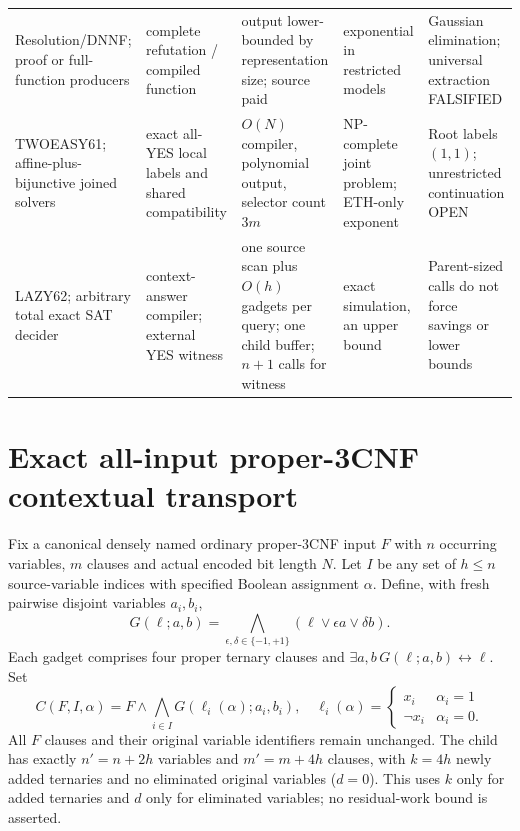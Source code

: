 \documentclass[11pt]{article}
\begin{document}
\begin{tabularx}{\linewidth}{@{}p{0.83in}p{1.02in}p{1.42in}p{1.14in}X@{}}
Resolution/DNNF; proof or full-function producers & complete refutation / compiled function & output lower-bounded by representation size; source paid & exponential in restricted models & Gaussian elimination; universal extraction FALSIFIED\\
TWOEASY61; affine-plus-bijunctive joined solvers & exact all-YES local labels and shared compatibility & $O(N)$ compiler, polynomial output, selector count $3m$ & NP-complete joint problem; ETH-only exponent & Root labels $(1,1)$; unrestricted continuation OPEN\\
LAZY62; arbitrary total exact SAT decider & context-answer compiler; external YES witness & one source scan plus $O(h)$ gadgets per query; one child buffer; $n+1$ calls for witness & exact simulation, an upper bound & Parent-sized calls do not force savings or lower bounds\\
\bottomrule
\end{tabularx}
\endgroup

\section{Exact all-input proper-3CNF contextual transport}
Fix a canonical densely named ordinary proper-3CNF input $F$ with $n$ occurring variables, $m$ clauses and actual encoded bit length $N$. Let $I$ be any set of $h\le n$ source-variable indices with specified Boolean assignment $\alpha$. Define, with fresh pairwise disjoint variables $a_i,b_i$,
\[
G(\ell;a,b)=\bigwedge_{\epsilon,\delta\in\{-1,+1\}}
(\ell\lor\epsilon a\lor\delta b).
\]
Each gadget comprises four proper ternary clauses and $\exists a,b\,G(\ell;a,b)\leftrightarrow\ell$.
Set
\[
C(F,I,\alpha)=F\wedge\bigwedge_{i\in I}G(\ell_i(\alpha);a_i,b_i),
\quad
\ell_i(\alpha)=\begin{cases}x_i&\alpha_i=1\\\neg x_i&\alpha_i=0.\end{cases}
\]
All $F$ clauses and their original variable identifiers remain unchanged. The child has exactly $n'=n+2h$ variables and $m'=m+4h$ clauses, with $k=4h$ newly added ternaries and no eliminated original variables ($d=0$). This uses $k$ only for added ternaries and $d$ only for eliminated variables; no residual-work bound is asserted.
\end{document}

